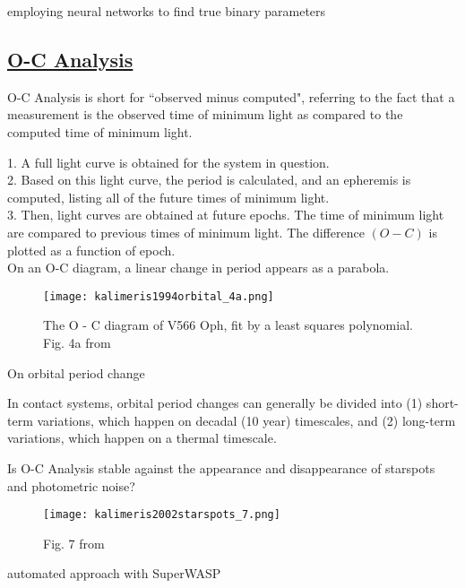 \documentclass[12pt]{article} %
\numberwithin{equation}{section} %
\begin{document}
employing neural networks to find true binary parameters \citep{zeraatgari2015neural}

\subsection[O-C Analysis]{\hyperlink{toc}{O-C Analysis}} \label{sec: O-C Analysis}

O-C Analysis is short for ``observed minus computed", referring to the fact that a measurement is the observed time of minimum light as compared to the computed time of minimum light. 

1. A full light curve is obtained for the system in question. \\
2. Based on this light curve, the period is calculated, and an epheremis is computed, listing all of the future times of minimum light. \\
3. Then, light curves are obtained at future epochs. The time of minimum light are compared to previous times of minimum light. The difference $(O-C)$ is plotted as a function of epoch. \\

On an O-C diagram, a linear change in period appears as a parabola.

\begin{figure}[H]
\centering
\texttt{[image: kalimeris1994orbital\_4a.png]}
\caption{ The O - C diagram of V566 Oph, fit by a least squares polynomial. Fig. 4a from \citet{kalimeris1994orbital}}
\label{fig: kalimeris1994orbital_4a}
\end{figure}

On orbital period change \citep{kalimeris1994orbital}

In contact systems, orbital period changes can generally be divided into (1) short-term variations, which happen on decadal (10 year) timescales, and (2) long-term variations, which happen on a thermal timescale.

Is O-C Analysis stable against the appearance and disappearance of starspots and photometric noise? \citep{kalimeris2002starspots}

\begin{figure}[H]
\centering
\texttt{[image: kalimeris2002starspots\_7.png]}
\caption{ Fig. 7 from \citet{kalimeris2002starspots}}
\label{fig: kalimeris2002starspots_7}
\end{figure}

automated approach with SuperWASP \citep{lohr2015orbital}
\end{document}
